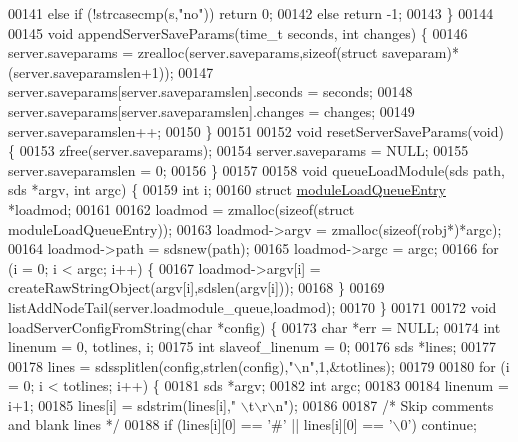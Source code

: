 \begin{DoxyCode}
00141     \textcolor{keywordflow}{else} \textcolor{keywordflow}{if} (!strcasecmp(s,\textcolor{stringliteral}{"no"})) \textcolor{keywordflow}{return} 0;
00142     \textcolor{keywordflow}{else} \textcolor{keywordflow}{return} -1;
00143 \}
00144 
00145 \textcolor{keywordtype}{void} appendServerSaveParams(time\_t seconds, \textcolor{keywordtype}{int} changes) \{
00146     server.saveparams = zrealloc(server.saveparams,\textcolor{keyword}{sizeof}(\textcolor{keyword}{struct} saveparam)*(server.saveparamslen+1));
00147     server.saveparams[server.saveparamslen].seconds = seconds;
00148     server.saveparams[server.saveparamslen].changes = changes;
00149     server.saveparamslen++;
00150 \}
00151 
00152 \textcolor{keywordtype}{void} resetServerSaveParams(\textcolor{keywordtype}{void}) \{
00153     zfree(server.saveparams);
00154     server.saveparams = NULL;
00155     server.saveparamslen = 0;
00156 \}
00157 
00158 \textcolor{keywordtype}{void} queueLoadModule(sds path, sds *argv, \textcolor{keywordtype}{int} argc) \{
00159     \textcolor{keywordtype}{int} i;
00160     \textcolor{keyword}{struct} \hyperlink{structmoduleLoadQueueEntry}{moduleLoadQueueEntry} *loadmod;
00161 
00162     loadmod = zmalloc(\textcolor{keyword}{sizeof}(\textcolor{keyword}{struct} moduleLoadQueueEntry));
00163     loadmod->argv = zmalloc(\textcolor{keyword}{sizeof}(robj*)*argc);
00164     loadmod->path = sdsnew(path);
00165     loadmod->argc = argc;
00166     \textcolor{keywordflow}{for} (i = 0; i < argc; i++) \{
00167         loadmod->argv[i] = createRawStringObject(argv[i],sdslen(argv[i]));
00168     \}
00169     listAddNodeTail(server.loadmodule\_queue,loadmod);
00170 \}
00171 
00172 \textcolor{keywordtype}{void} loadServerConfigFromString(\textcolor{keywordtype}{char} *config) \{
00173     \textcolor{keywordtype}{char} *err = NULL;
00174     \textcolor{keywordtype}{int} linenum = 0, totlines, i;
00175     \textcolor{keywordtype}{int} slaveof\_linenum = 0;
00176     sds *lines;
00177 
00178     lines = sdssplitlen(config,strlen(config),\textcolor{stringliteral}{"\(\backslash\)n"},1,&totlines);
00179 
00180     \textcolor{keywordflow}{for} (i = 0; i < totlines; i++) \{
00181         sds *argv;
00182         \textcolor{keywordtype}{int} argc;
00183 
00184         linenum = i+1;
00185         lines[i] = sdstrim(lines[i],\textcolor{stringliteral}{" \(\backslash\)t\(\backslash\)r\(\backslash\)n"});
00186 
00187         \textcolor{comment}{/* Skip comments and blank lines */}
00188         \textcolor{keywordflow}{if} (lines[i][0] == \textcolor{stringliteral}{'#'} || lines[i][0] == \textcolor{stringliteral}{'\(\backslash\)0'}) \textcolor{keywordflow}{continue};

\end{DoxyCode}
